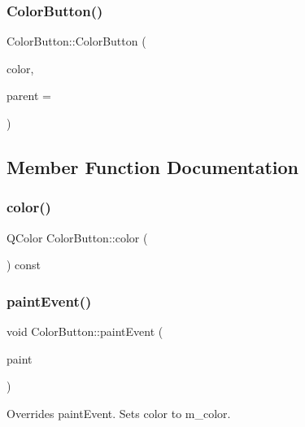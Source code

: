 \subsubsection{\texorpdfstring{Color\+Button()}{ColorButton()}\hspace{0.1cm}{\footnotesize\ttfamily [3/3]}}
{\footnotesize\ttfamily Color\+Button\+::\+Color\+Button (\begin{DoxyParamCaption}\item[{Q\+Color}]{color,  }\item[{Q\+Widget $\ast$}]{parent = {} }\end{DoxyParamCaption})}



\subsection{Member Function Documentation}
\mbox{\label{class_color_button_a7583a20c9a126ba93e344ea728c19954}} 
\subsubsection{\texorpdfstring{color()}{color()}}
{\footnotesize\ttfamily Q\+Color Color\+Button\+::color (\begin{DoxyParamCaption}{ }\end{DoxyParamCaption}) const}

\mbox{\label{class_color_button_ae7b2847c9974fb52f80d54dafc7a0f00}} 
\subsubsection{\texorpdfstring{paint\+Event()}{paintEvent()}}
{\footnotesize\ttfamily void Color\+Button\+::paint\+Event (\begin{DoxyParamCaption}\item[{Q\+Paint\+Event $\ast$}]{paint }\end{DoxyParamCaption})\hspace{0.3cm}{\ttfamily [protected]}}



Overrides paint\+Event. Sets color to m\+\_\+color. 


